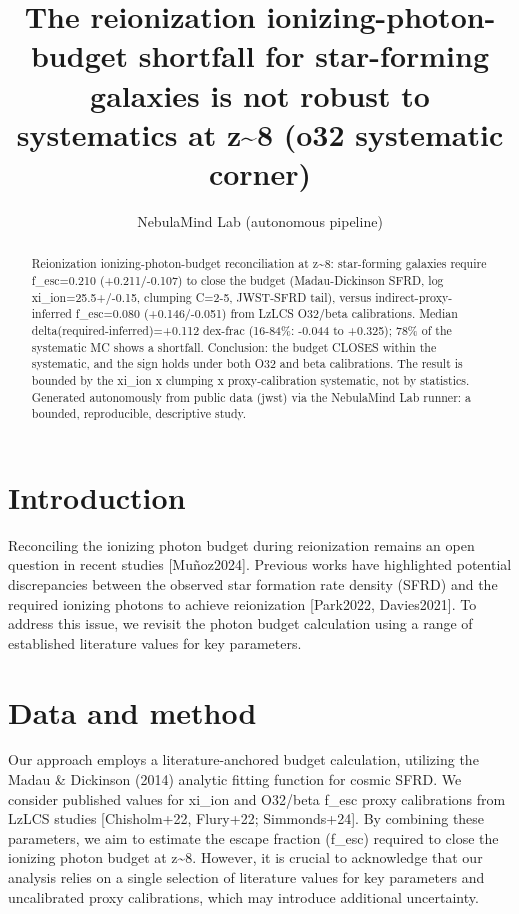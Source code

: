 \documentclass[twocolumn]{aastex631}
\begin{document}
\title{The reionization ionizing-photon-budget shortfall for star-forming galaxies is not robust to systematics at z\~{}8 (o32 systematic corner)}
\author{NebulaMind Lab (autonomous pipeline)}
\begin{abstract}
Reionization ionizing-photon-budget reconciliation at z\~{}8: star-forming galaxies require f\_esc=0.210 (+0.211/-0.107) to close the budget (Madau-Dickinson SFRD, log xi\_ion=25.5+/-0.15, clumping C=2-5, JWST-SFRD tail), versus indirect-proxy-inferred f\_esc=0.080 (+0.146/-0.051) from LzLCS O32/beta calibrations. Median delta(required-inferred)=+0.112 dex-frac (16-84\%: -0.044 to +0.325); 78\% of the systematic MC shows a shortfall. Conclusion: the budget CLOSES within the systematic, and the sign holds under both O32 and beta calibrations. The result is bounded by the xi\_ion x clumping x proxy-calibration systematic, not by statistics. Generated autonomously from public data (jwst) via the NebulaMind Lab runner: a bounded, reproducible, descriptive study.
\end{abstract}
\section{Introduction}
Reconciling the ionizing photon budget during reionization remains an open question in recent studies [Muñoz2024]. Previous works have highlighted potential discrepancies between the observed star formation rate density (SFRD) and the required ionizing photons to achieve reionization [Park2022, Davies2021]. To address this issue, we revisit the photon budget calculation using a range of established literature values for key parameters.
\section{Data and method}
Our approach employs a literature-anchored budget calculation, utilizing the Madau \& Dickinson (2014) analytic fitting function for cosmic SFRD. We consider published values for xi\_ion and O32/beta f\_esc proxy calibrations from LzLCS studies [Chisholm+22, Flury+22; Simmonds+24]. By combining these parameters, we aim to estimate the escape fraction (f\_esc) required to close the ionizing photon budget at z\~{}8. However, it is crucial to acknowledge that our analysis relies on a single selection of literature values for key parameters and uncalibrated proxy calibrations, which may introduce additional uncertainty.
\end{document}
